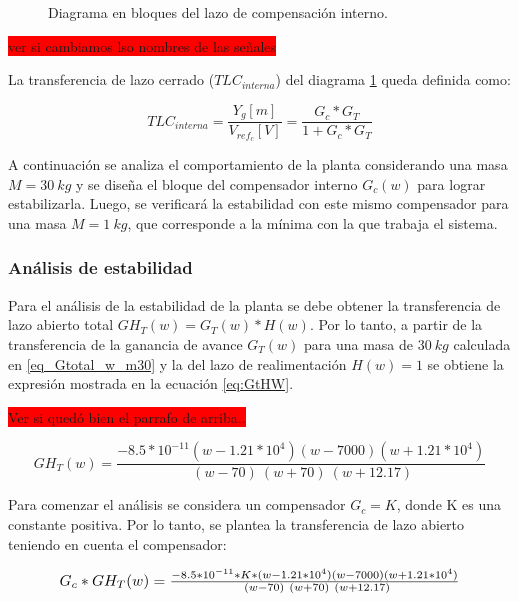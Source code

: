 \begin{figure}[H]
	\centering
	
	\caption{Diagrama en bloques del lazo de compensación interno.}	\label{fig:diag-interno_dig}
\end{figure}

\colorbox{red}{ver si cambiamos lso nombres de las señales}

La transferencia de lazo cerrado ($TLC_{interna}$) del diagrama \ref{fig:diag-interno_dig} queda definida como:

\begin{equation}
	TLC_{interna}=\frac{Y_g[m]}{V_{ref_c}[V]}=\frac{G_c*G_T}{1+G_c*G_T}
\end{equation}

A continuación se analiza el comportamiento de la planta considerando una masa $M=30\:kg$ y se diseña el bloque del compensador interno $G_c(w)$ para lograr estabilizarla. Luego, se verificará la estabilidad con este mismo compensador para una masa $M=1\:kg$, que corresponde a la mínima con la que trabaja el sistema.

\subsubsection{Análisis de estabilidad}

 Para el análisis de la estabilidad de la planta se debe obtener la transferencia de lazo abierto total $GH_T(w)=G_T(w)*H(w)$. Por lo tanto, a partir de la transferencia de la ganancia de avance $G_{T}(w)$ para una masa de $30\:kg$ calculada en \ref{eq_Gtotal_w_m30} y la del lazo de realimentación $H(w)=1$ se obtiene la expresión mostrada en la ecuación \ref{eq:GtHW}.

\colorbox{red}{Ver si quedó bien el parrafo de arriba..}
 
\begin{equation}
	\label{eq:GtHW}  
	GH_{T}(w)=\frac{-8.5*10^{-11}(w-1.21*10^4)(w-7000)(w+1.21*10^4)}{\ (w-70)\ (w+70)\ (w+12.17)} 
\end{equation} 
 
Para comenzar el análisis se considera un compensador $G_c=K$, donde K es una constante positiva. Por lo tanto, se plantea la transferencia de lazo abierto teniendo en cuenta el compensador:
 
 \begin{equation} \label{eq_GT3_dig}
 		\resizebox{.85\hsize}{!}
 	{
 	$G_c*GH_T(w)=\frac{-8.5*10^{-11}*K*(w-1.21*10^4)(w-7000)(w+1.21*10^4)}{\ (w-70)\ (w+70)\ (w+12.17)}$ 
 }
 \end{equation}


